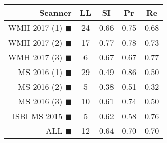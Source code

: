 \begin{tabular}{rcccc}
\toprule
Scanner & LL & SI & Pr & Re \\
\midrule
WMH 2017 (1) {\color[rgb]{ 1.00 0.00 0.00}$\blacksquare$} & 24 & 0.66 & 0.75 & 0.68 \\
WMH 2017 (2) {\color[rgb]{ 1.00 0.50 0.00}$\blacksquare$} & 17 & 0.77 & 0.78 & 0.73 \\
WMH 2017 (3) {\color[rgb]{ 1.00 0.80 0.00}$\blacksquare$} & 6 & 0.67 & 0.67 & 0.77 \\
MS  2016 (1) {\color[rgb]{ 0.20 0.80 0.00}$\blacksquare$} & 29 & 0.49 & 0.86 & 0.50 \\
MS  2016 (2) {\color[rgb]{ 0.00 0.40 1.00}$\blacksquare$} & 5 & 0.38 & 0.51 & 0.32 \\
MS  2016 (3) {\color[rgb]{ 0.60 0.00 1.00}$\blacksquare$} & 10 & 0.61 & 0.74 & 0.50 \\
ISBI MS 2015 {\color[rgb]{ 1.00 0.00 1.00}$\blacksquare$} & 5 & 0.62 & 0.58 & 0.76 \\
\midrule
ALL {\color[rgb]{ 1.00 1.00 1.00}$\blacksquare$} & 12 & 0.64 & 0.70 & 0.70 \\
\bottomrule
\end{tabular}